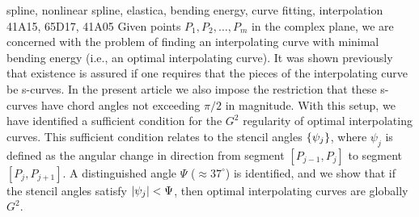     \keywords  spline, nonlinear spline, elastica, bending energy, curve fitting, interpolation
    \endkeywords
    \subjclass   41A15, 65D17, 41A05    \endsubjclass
    \abstract
Given points $P_1,P_2,\ldots,P_m$ in the complex plane, we are concerned with the problem of finding
an interpolating curve with minimal bending energy (i.e., an optimal interpolating curve). It was shown
previously that existence is assured if one requires that the pieces of the interpolating curve be s-curves.
In the present article we also impose the restriction that these s-curves have chord angles not exceeding
$\pi/2$ in magnitude. %
With this setup, we have identified a sufficient condition for the $G^2$ regularity of optimal interpolating
curves. This sufficient condition relates to the stencil angles $\{\psi_j\}$, where $\psi_j$ is defined
as the angular
change in direction from segment $[P_{j-1},P_j]$ to segment $[P_j,P_{j+1}]$. A distinguished angle
$\Psi$ ($\approx 37^\circ$) is identified, and we show that if the stencil angles satisfy $\left\vert {\psi_j} \right\vert<\Psi$, then
optimal interpolating curves are globally $G^2$.

